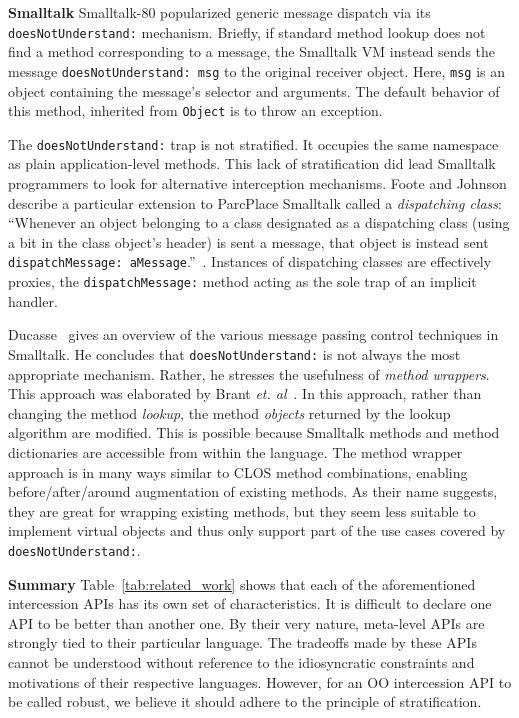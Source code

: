 \documentclass{sig-alternate}
\begin{document}
\textbf{Smalltalk} Smalltalk-80 popularized generic message dispatch via its \texttt{doesNotUnderstand:} mechanism. Briefly, if standard method lookup does not find a method corresponding to a message, the Smalltalk VM instead sends the message \texttt{doesNotUnderstand: msg} to the original receiver object. Here, \texttt{msg} is an object containing the message's selector and arguments. The default behavior of this method, inherited from \texttt{Object} is to throw an exception.

The \texttt{doesNotUnderstand:} trap is not stratified. It occupies the same namespace as plain application-level methods. This lack of stratification did lead Smalltalk programmers to look for alternative interception mechanisms. Foote and Johnson describe a particular extension to ParcPlace Smalltalk called a \emph{dispatching class}: ``Whenever an object belonging to a class designated as a dispatching class (using a bit in the class object's header) is sent a message, that object is instead sent \texttt{dispatchMessage: aMessage}.''~\cite{foote89reflective}. Instances of dispatching classes are effectively proxies, the \texttt{dispatchMessage:} method acting as the sole trap of an implicit handler.

Ducasse~\cite{ducasse99evaluatingmessage} gives an overview of the various message passing control techniques in Smalltalk. He concludes that \texttt{doesNotUnderstand:} is not always the most appropriate mechanism. Rather, he stresses the usefulness of \emph{method wrappers}. This approach was elaborated by Brant \emph{et. al}~\cite{brant98wrappers}. In this approach, rather than changing the method \emph{lookup}, the method \emph{objects} returned by the lookup algorithm are modified. This is possible because Smalltalk methods and method dictionaries are accessible from within the language. The method wrapper approach is in many ways similar to CLOS method combinations, enabling before/after/around augmentation of existing methods. As their name suggests, they are great for wrapping existing methods, but they seem less suitable to implement virtual objects and thus only support part of the use cases covered by \texttt{doesNotUnderstand:}.

\textbf{Summary} Table~\ref{tab:related_work} shows that each of the aforementioned intercession APIs has its own set of characteristics. It is difficult to declare one API to be better than another one. By their very nature, meta-level APIs are strongly tied to their particular language. The tradeoffs made by these APIs cannot be understood without reference to the idiosyncratic constraints and motivations of their respective languages. However, for an OO intercession API to be called robust, we believe it should adhere to the principle of stratification.
\end{document}
